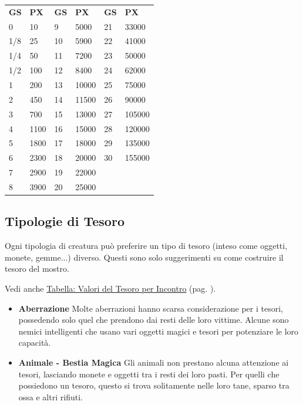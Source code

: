 \begin{multicols}{2}
\medskip

\begin{tabularx}{0.42\textwidth}{ll|ll|ll}

\textbf{GS} & \textbf{PX} &\textbf{GS} & \textbf{PX} &\textbf{GS} & \textbf{PX}\\
0& 10 &9& 5000& 21&33000\\
1/8& 25 &10& 5900&22&41000\\
1/4& 50 &11& 7200&23&50000\\
1/2& 100 &12& 8400&24&62000\\
1& 200 &13& 10000&25&75000\\
2& 450&14& 11500&26&90000\\
3& 700&15& 13000&27&105000\\
4& 1100&16& 15000&28&120000\\
5& 1800&17& 18000&29&135000\\
6& 2300&18& 20000&30&155000\\
7& 2900&19& 22000&&\\
8& 3900&20& 25000&&
\end{tabularx}

\subsection{Tipologie di Tesoro}

Ogni tipologia di creatura può preferire un tipo di tesoro (inteso come oggetti, monete, gemme...) diverso. Questi sono solo suggerimenti su come costruire il tesoro del mostro.

Vedi anche \hyperlink{valoretesoroincontro}{Tabella: Valori del Tesoro per Incontro} (pag. \pageref{valoretesoroincontro}).

\medskip

\begin{itemize}[leftmargin=*] \setlength{\itemsep}{0pt}

	\item \textbf{Aberrazione}
	Molte aberrazioni hanno scarsa considerazione per i tesori, possedendo solo quel che prendono dai resti delle loro vittime. Alcune sono nemici intelligenti che usano vari oggetti magici e tesori per potenziare le loro capacità.

	\item \textbf{Animale - Bestia Magica} Gli animali non prestano alcuna attenzione ai tesori, lasciando monete e oggetti tra i resti dei loro pasti. Per quelli che possiedono un tesoro, questo si trova solitamente nelle loro tane, sparso tra ossa e altri rifiuti.


\end{itemize}
\end{multicols}
